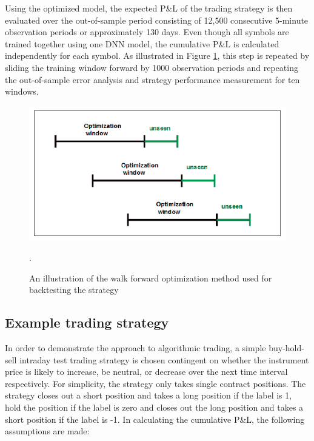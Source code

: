 \documentclass{article}
\begin{document}
Using the optimized model, the expected P\&L of the trading strategy is then
evaluated over the out-of-sample period consisting of 12,500 consecutive 5-minute observation periods or approximately 130 days. Even though all symbols
are trained together using one DNN model, the cumulative P\&L is calculated independently for each
symbol.  As illustrated
in Figure \ref{fig:back_testing}, this step is repeated by sliding the training window forward by 1000 observation periods and repeating the out-of-sample error analysis and strategy performance measurement for ten windows.

\vspace{20pt}
\begin{figure}[h]
\centering
\includegraphics[scale=0.5]{figures/back_testing.png}
\caption{An illustration of the walk forward optimization method used for
backtesting the strategy}.
\label{fig:back_testing}
\end{figure}
\vspace{6pt}

\subsection{Example trading strategy} In order to demonstrate the approach to algorithmic trading, a simple buy-hold-sell intraday test trading strategy is chosen contingent on whether the instrument price is likely to increase, be neutral, or decrease over the next
time interval respectively. For simplicity, the strategy only takes single contract positions. The strategy closes out a short position and takes a long position if the label is 1, hold the position if the label is zero and closes out the long position and takes a short position if the label is -1. In calculating the cumulative P\&L, the following assumptions are made:
\end{document}
